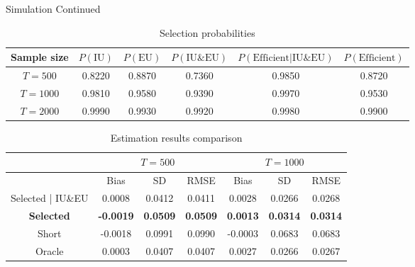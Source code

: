 \documentclass[final]{beamer}
\newlength{\colwidth}
\begin{document}
\begin{frame}[t]
\begin{columns}[t]
\begin{column}{\colwidth}
\begin{block}{Simulation Continued}
\begin{tikzpicture}[node distance=2cm and 1.5cm, auto, scale=0.8, transform shape]
\end{tikzpicture}
        \begin{table}
        \renewcommand{\arraystretch}{1.5}
        \renewcommand*\familydefault{\sfdefault}
        \caption{Selection probabilities}
         \vspace{-3mm}
        \begin{centering}
        \begin{tabular}{cccccc}
        \hline 
        Sample size & $P(\text{IU})$ & $P(\text{EU})$ & $P(\text{IU\&EU})$ & $P(\text{Efficient|IU\&EU})$ & $P(\text{Efficient})$\tabularnewline
        \hline 
        $T=500$ & 0.8220 & 0.8870 & 0.7360 & 0.9850 & 0.8720\tabularnewline
        $T=1000$ & 0.9810 & 0.9580 & 0.9390 & 0.9970 & 0.9530\tabularnewline
        $T=2000$ & 0.9990 & 0.9930 & 0.9920 & 0.9980 & 0.9900\tabularnewline
        \hline 
        \end{tabular}
        \par\end{centering}
        \centering{}
        \end{table}
     \vspace{-5mm}
    \begin{table}
    \renewcommand{\arraystretch}{1.5}
    \renewcommand*\familydefault{\sfdefault}
     \begin{centering}
     \caption{Estimation results comparison}
     \vspace{-3mm}
    \begin{tabular}{ccccccc}
    \hline 
     & \multicolumn{3}{c}{$T=500$} & \multicolumn{3}{c}{$T=1000$}\tabularnewline
    \hline 
     & Bias & SD & RMSE & Bias & SD & RMSE\tabularnewline
    Selected | IU\&EU & 0.0008 & 0.0412 & 0.0411 & 0.0028 & 0.0266 & 0.0268\tabularnewline
    \textbf{Selected} & \textbf{-0.0019} & \textbf{0.0509} & \textbf{0.0509} & \textbf{0.0013} & \textbf{0.0314} & \textbf{0.0314}\tabularnewline
    Short & -0.0018 & 0.0991 & 0.0990 & -0.0003 & 0.0683 & 0.0683\tabularnewline
    Oracle & 0.0003 & 0.0407 & 0.0407 & 0.0027 & 0.0266 & 0.0267\tabularnewline
    \hline 
    \end{tabular}
    \par\end{centering}
    \centering{}
    \end{table}

 \end{block}



\end{column}
\end{columns}
\end{frame}
\end{document}
